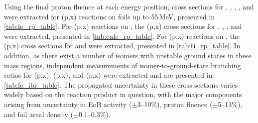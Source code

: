 



Using the final proton fluence at each energy position, cross sections for , ,  ,   , and 
 were extracted for (p,x) reactions  on  foils up to 55\,MeV, presented in \autoref{tab:fe_rp_table}.
For  (p,x) reactions on , the (p,x) cross sections for  , , ,   and   were extracted, 
presented in \autoref{tab:cufe_rp_table}.
For  (p,x) reactions on , the (p,x) cross sections for   and   were extracted, 
presented in \autoref{tab:ti_rp_table}.
In addition, as there exist a number of isomers with 
unstable ground states in these mass regions,  independent measurements of isomer-to-ground-state branching ratios for (p,x), (p,x), and (p,x) were  extracted and are presented in \autoref{tab:fe_ibr_table}.
The propagated uncertainty in these cross sections varies widely based on the reaction product in question, with the major components  arising from uncertainty in EoB activity ($\pm$3--10\%), proton fluence ($\pm$5--13\%), and foil areal density ($\pm$0.1--0.3\%).















